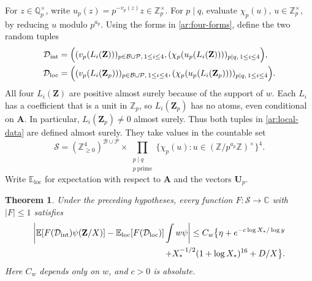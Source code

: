 \documentclass[twoside]{aomart}
\theoremstyle{paperplain}
\newtheorem{theorem}{Theorem}[section]
\theoremstyle{paperdefinition}
\newcommand{\E}{\mathbb E}
\newcommand{\Z}{\mathbb Z}
\newcommand{\Q}{\mathbb Q}
\newcommand{\C}{\mathbb C}
\numberwithin{equation}{section}
\begin{document}
For $z\in\Q_p^\times$, write $u_p(z)=p^{-v_p(z)}z\in\Z_p^\times$.
For $p\mid q$, evaluate $\chi_p(u)$, $u\in\Z_p^\times$,
by reducing $u$ modulo $p^{a_p}$.
Using the forms in \eqref{ar:four-forms}, define the two random tuples
\begin{equation}
 \begin{aligned}
 \mathcal D_{\mathrm{int}}
 &=\Bigl((v_p(L_i(\mathbf Z)))_{p\in\mathcal B\cup\mathcal P,\,1\le i\le4},
       (\chi_p(u_p(L_i(\mathbf Z))))_{p\mid q,\,1\le i\le4}\Bigr),\\
 \mathcal D_{\mathrm{loc}}
 &=\Bigl((v_p(L_i(\mathbf Z_p)))_{p\in\mathcal B\cup\mathcal P,\,1\le i\le4},
       (\chi_p(u_p(L_i(\mathbf Z_p))))_{p\mid q,\,1\le i\le4}\Bigr).
 \end{aligned}
 \label{ar:local-data}
\end{equation}
All four $L_i(\mathbf Z)$ are positive almost surely because of
the support of $w$. Each $L_i$ has a coefficient that is a unit
in $\Z_p$, so $L_i(\mathbf Z_p)$ has no atoms, even conditional
on $\mathbf A$. In particular, $L_i(\mathbf Z_p)\ne0$ almost surely.
Thus both tuples in \eqref{ar:local-data} are defined almost surely.
They take values in the countable set
\begin{equation}
 \mathscr S=(\Z_{\ge0}^4)^{\mathcal B\cup\mathcal P}
       \times\prod_{\substack{p\mid q\\p\ \mathrm{prime}}}\{\chi_p(u):u\in(\Z/p^{a_p}\Z)^\times\}^{4}.
 \label{ar:matching-data-space}
\end{equation}
Write $\E_{\mathrm{loc}}$ for expectation with respect to
$\mathbf A$ and the vectors $\mathbf U_p$.
\begin{theorem}
\label{ar:matching}
Under the preceding hypotheses, every function
$F:\mathscr S\to\C$ with $|F|\le1$ satisfies
\begin{equation}
 \begin{split}
 \left|\E\!\left[F(\mathcal D_{\mathrm{int}})\psi(\mathbf Z/X)\right]
 -\E_{\mathrm{loc}}\!\left[F(\mathcal D_{\mathrm{loc}})\right]
     \int w\psi\right|
 \le C_w\bigl\{\eta+e^{-c\log X_*/\log y}\\
 \hspace{35mm}
 +X_*^{-1/2}(1+\log X_*)^{16}+D/X\bigr\}.
 \end{split}
 \label{ar:matching-error}
\end{equation}
Here $C_w$ depends only on $w$, and $c>0$ is absolute.
\end{theorem}
\end{document}
